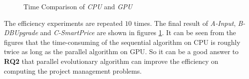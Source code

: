 \begin{figure}[!htb]
  \centering
  \caption{Time Comparison of \emph{CPU} and \emph{GPU}}
  \label{fig:co}
\end{figure}

The efficiency experiments are repeated $10$ times.  The final result of
\emph{A-Input}, \emph{B-DBUpgrade} and \emph{C-SmartPrice} are shown in figures
\ref{fig:co}. It can be seen from the figures that the time-consuming of the
sequential algorithm on CPU is roughly twice as long as the parallel algorithm
on GPU. So it can be a good answer to \textbf{RQ2} that parallel evolutionary
algorithm can improve the efficiency on computing the project management
problems.

